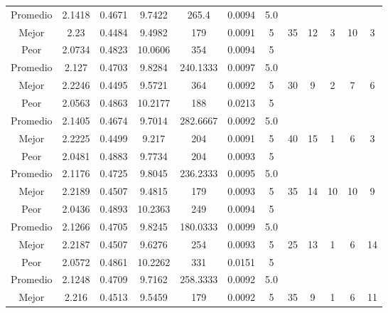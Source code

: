 \begin{table}[h!]
\begin{center}
\begin{tabular}{|c|c|c|c|c|c|c|c|c|c|c|c|}
        \hline
        \hline
            Promedio  & 2.1418 & 0.4671 & 9.7422 & 265.4 & 0.0094 & 5.0 &  &  &  &  & \\
            \cline{1-7}
            Mejor & 2.23 & 0.4484  & 9.4982 & 179 & 0.0091 & 5 & 35 & 12 & 3 & 10 & 3\\
            \cline{1-7}
            Peor & 2.0734 & 0.4823  & 10.0606 & 354 & 0.0094 & 5 &  &  &  &  & \\
        \hline
        \hline
            Promedio  & 2.127 & 0.4703 & 9.8284 & 240.1333 & 0.0097 & 5.0 &  &  &  &  & \\
            \cline{1-7}
            Mejor & 2.2246 & 0.4495  & 9.5721 & 364 & 0.0092 & 5 & 30 & 9 & 2 & 7 & 6\\
            \cline{1-7}
            Peor & 2.0563 & 0.4863  & 10.2177 & 188 & 0.0213 & 5 &  &  &  &  & \\
        \hline
        \hline
            Promedio  & 2.1405 & 0.4674 & 9.7014 & 282.6667 & 0.0092 & 5.0 &  &  &  &  & \\
            \cline{1-7}
            Mejor & 2.2225 & 0.4499  & 9.217 & 204 & 0.0091 & 5 & 40 & 15 & 1 & 6 & 3\\
            \cline{1-7}
            Peor & 2.0481 & 0.4883  & 9.7734 & 204 & 0.0093 & 5 &  &  &  &  & \\
        \hline
        \hline
            Promedio  & 2.1176 & 0.4725 & 9.8045 & 236.2333 & 0.0095 & 5.0 &  &  &  &  & \\
            \cline{1-7}
            Mejor & 2.2189 & 0.4507  & 9.4815 & 179 & 0.0093 & 5 & 35 & 14 & 10 & 10 & 9\\
            \cline{1-7}
            Peor & 2.0436 & 0.4893  & 10.2363 & 249 & 0.0094 & 5 &  &  &  &  & \\
        \hline
        \hline
            Promedio  & 2.1266 & 0.4705 & 9.8245 & 180.0333 & 0.0099 & 5.0 &  &  &  &  & \\
            \cline{1-7}
            Mejor & 2.2187 & 0.4507  & 9.6276 & 254 & 0.0093 & 5 & 25 & 13 & 1 & 6 & 14\\
            \cline{1-7}
            Peor & 2.0572 & 0.4861  & 10.2262 & 331 & 0.0151 & 5 &  &  &  &  & \\
        \hline
        \hline
            Promedio  & 2.1248 & 0.4709 & 9.7162 & 258.3333 & 0.0092 & 5.0 &  &  &  &  & \\
            \cline{1-7}
            Mejor & 2.216 & 0.4513  & 9.5459 & 179 & 0.0092 & 5 & 35 & 9 & 1 & 6 & 11\\

\end{tabular}
\end{center}
\end{table}
